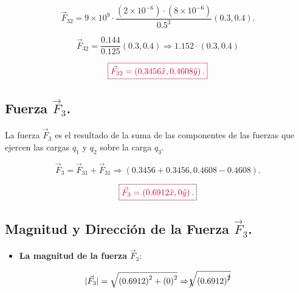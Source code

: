 \documentclass[a4paper,12pt]{article} %
\begin{document}
\[ \vec{F}_{32} = 9 \times 10^9 \cdot \frac{\left( 2 \times 10 ^{-6} \right) \cdot \left( 8 \times 10^{-6} \right)}{0.5^3} \left( 0.3 , 0.4 \right). \]

\vspace{\baselineskip}

\[ \vec{F}_{32} = \frac{0.144}{0.125} \left( 0.3 , 0.4 \right)  \Rightarrow 1.152 \cdot \left( 0.3 , 0.4 \right) \]

\vspace{\baselineskip}

\[ \textcolor{purple}{\boxed{ \vec{F}_{32} = \left( 0.3456\hat{x} , 0.4608\hat{y} \right).}} \]

\vspace{\baselineskip}

\subsection{Fuerza \(\vec{F}_3\).}

\begin{justify}
	La fuerza \(\vec{F}_3\) es el resultado de la suma de las componentes de las fuerzas que ejercen las cargas \(q_1\) y \(q_2\) sobre la carga \(q_3\).
\end{justify}

\[  \vec{F}_3 = \vec{F}_{31} + \vec{F}_{31}  \Rightarrow \left( 0.3456 + 0.3456 , 0.4608 - 0.4608 \right).\]

\[ \textcolor{purple}{ \boxed{\vec{F}_3 = \left(  0.6912 \hat{x} , 0\hat{y} \right).}}\]

\subsection{Magnitud y Dirección de la Fuerza \(\vec{F}_3\). }

\vspace{\baselineskip}

\begin{justify}
	\begin{itemize}
		\item \textbf{La magnitud de la fuerza} \(\vec{F}_3\):
	\end{itemize}
\end{justify}



\[ \vert \vec{F}_3 \vert = \sqrt{\left( 0.6912  \right)^2 + \left( 0 \right)^2} \Rightarrow \cancel{}\sqrt[]{\left(  0.6912  \right)^{\cancel{2}}} \]

\vspace{\baselineskip}
\end{document}
